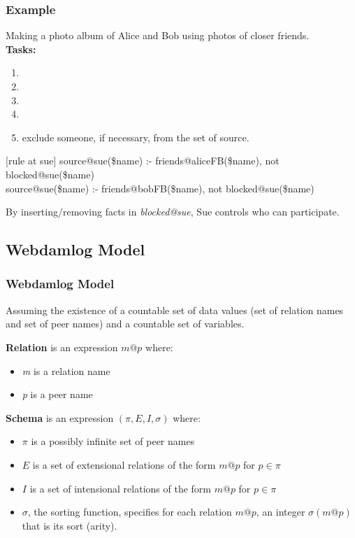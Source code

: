 \documentclass{beamer}
\begin{document}
\frame
{
	\frametitle{Example}
	
	Making a photo album of Alice and Bob using photos of closer friends. \\
	\textbf{Tasks:}
	\begin{enumerate}
		\item 
		\item  
		\item 
		\item 
		\item exclude someone, if necessary, from the set of source.
	\end{enumerate}

	\begin{block}{[rule at sue]}
		source@sue(\$name) :- friends@aliceFB(\$name), not blocked@sue(\$name) \\
		source@sue(\$name) :- friends@bobFB(\$name), not blocked@sue(\$name) \\
	\end{block}

	By inserting/removing facts in \textit{blocked@sue}, Sue controls who can participate.
	
}

\subsection{Webdamlog Model}
\frame
{
	\frametitle{Webdamlog Model}
	
	Assuming the existence of a countable set of data values (set of relation names and set of peer names) and a countable set of variables. \\
	\begin{block}{\textbf{Relation} is an expression \textit{$m@p$} where:}
	\begin{itemize}
		\item \textit{m} is a relation name
		\item \textit{p} is a peer name
	\end{itemize}
	\end{block}

	\begin{block}{\textbf{Schema} is an expression \textit{$(\pi ,E,I,\sigma )$} where:}
	\begin{itemize}
		\item $\pi$ is a possibly infinite set of peer names
		\item $E$ is a set of extensional relations of the form $m@p$ for $ p \in \pi $
		\item $I$ is a set of intensional relations of the form $m@p$ for $ p \in \pi $
		\item $\sigma$, the sorting function, specifies for each relation $m@p$, an integer $\sigma(m@p)$ that is its sort (arity).
	\end{itemize}
	\end{block}	
		
}
\end{document}
